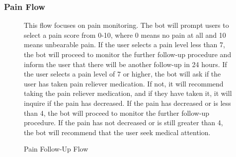 \documentclass[12pt,oneside,openright,a4paper]{cpe-english-project}
\begin{document}
        \subsubsection{Pain Flow}
          \begin{figure}[H]
            \centering
            \caption{Pain Follow-Up Flow}\label{fig:FollowUpFlow3}
            \begin{justify}
              \qquad This flow focuses on pain monitoring. The bot will prompt users to select a pain score from 0-10, where 0 means no pain at all and 10 means unbearable pain. If the user selects a pain level less than 7, the bot will proceed to monitor the  further follow-up procedure and inform the user that there will be another follow-up in 24 hours. If the user selects a pain level of 7 or higher, the bot will ask if the user has taken pain reliever medication. If not, it will recommend taking the pain reliever medication, and if they have taken it, it will inquire if the pain has decreased. If the pain has decreased or is less than 4, the bot will proceed to monitor the further follow-up procedure. If the pain has not decreased or is still greater than 4, the bot will recommend that the user seek medical attention.\par
            \end{justify}        
          \end{figure}
\end{document}
